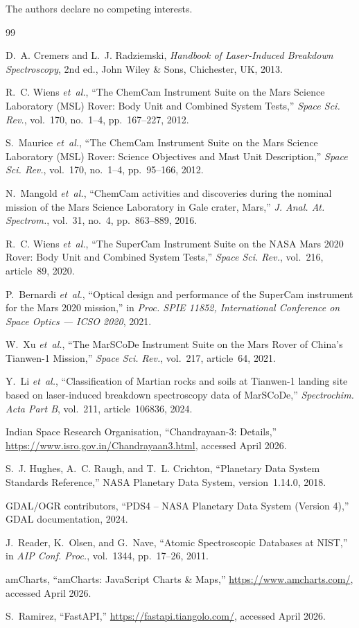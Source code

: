 \documentclass[11pt,a4paper]{article}
\begin{document}
The authors declare no competing interests.

\begin{thebibliography}{99}

D.~A. Cremers and L.~J. Radziemski, \textit{Handbook of Laser-Induced Breakdown Spectroscopy}, 2nd ed., John Wiley \& Sons, Chichester, UK, 2013.

R.~C. Wiens \textit{et~al.}, ``The ChemCam Instrument Suite on the Mars Science Laboratory (MSL) Rover: Body Unit and Combined System Tests,'' \textit{Space Sci. Rev.}, vol.~170, no.~1--4, pp.~167--227, 2012.

S.~Maurice \textit{et~al.}, ``The ChemCam Instrument Suite on the Mars Science Laboratory (MSL) Rover: Science Objectives and Mast Unit Description,'' \textit{Space Sci. Rev.}, vol.~170, no.~1--4, pp.~95--166, 2012.

N.~Mangold \textit{et~al.}, ``ChemCam activities and discoveries during the nominal mission of the Mars Science Laboratory in Gale crater, Mars,'' \textit{J. Anal. At. Spectrom.}, vol.~31, no.~4, pp.~863--889, 2016.

R.~C. Wiens \textit{et~al.}, ``The SuperCam Instrument Suite on the NASA Mars 2020 Rover: Body Unit and Combined System Tests,'' \textit{Space Sci. Rev.}, vol.~216, article~89, 2020.

P.~Bernardi \textit{et~al.}, ``Optical design and performance of the SuperCam instrument for the Mars 2020 mission,'' in \textit{Proc. SPIE 11852, International Conference on Space Optics — ICSO 2020}, 2021.

W.~Xu \textit{et~al.}, ``The MarSCoDe Instrument Suite on the Mars Rover of China's Tianwen-1 Mission,'' \textit{Space Sci. Rev.}, vol.~217, article~64, 2021.

Y.~Li \textit{et~al.}, ``Classification of Martian rocks and soils at Tianwen-1 landing site based on laser-induced breakdown spectroscopy data of MarSCoDe,'' \textit{Spectrochim. Acta Part B}, vol.~211, article~106836, 2024.

Indian Space Research Organisation, ``Chandrayaan-3: Details,'' \url{https://www.isro.gov.in/Chandrayaan3.html}, accessed April 2026.

S.~J. Hughes, A.~C. Raugh, and T.~L. Crichton, ``Planetary Data System Standards Reference,'' NASA Planetary Data System, version~1.14.0, 2018.

GDAL/OGR contributors, ``PDS4 -- NASA Planetary Data System (Version 4),'' GDAL documentation, 2024.

J.~Reader, K.~Olsen, and G.~Nave, ``Atomic Spectroscopic Databases at NIST,'' in \textit{AIP Conf. Proc.}, vol.~1344, pp.~17--26, 2011.

amCharts, ``amCharts: JavaScript Charts \& Maps,'' \url{https://www.amcharts.com/}, accessed April 2026.

S.~Ramirez, ``FastAPI,'' \url{https://fastapi.tiangolo.com/}, accessed April 2026.

\end{thebibliography}
\end{document}

